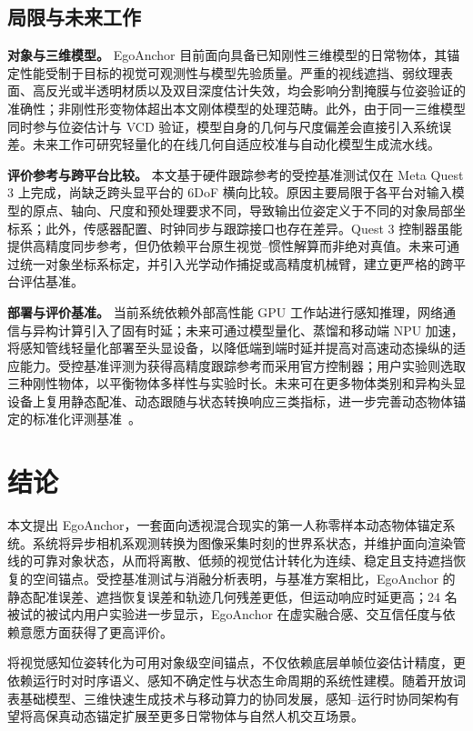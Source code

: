 \documentclass[review]{vgtc}
\begin{document}
\subsection{局限与未来工作}

\textbf{对象与三维模型。}
EgoAnchor 目前面向具备已知刚性三维模型的日常物体，其锚定性能受制于目标的视觉可观测性与模型先验质量。严重的视线遮挡、弱纹理表面、高反光或半透明材质以及双目深度估计失效，均会影响分割掩膜与位姿验证的准确性；非刚性形变物体超出本文刚体模型的处理范畴。此外，由于同一三维模型同时参与位姿估计与 VCD 验证，模型自身的几何与尺度偏差会直接引入系统误差。未来工作可研究轻量化的在线几何自适应校准与自动化模型生成流水线。

\textbf{评价参考与跨平台比较。}
本文基于硬件跟踪参考的受控基准测试仅在 Meta Quest 3 上完成，尚缺乏跨头显平台的 6DoF 横向比较。原因主要局限于各平台对输入模型的原点、轴向、尺度和预处理要求不同，导致输出位姿定义于不同的对象局部坐标系；此外，传感器配置、时钟同步与跟踪接口也存在差异。Quest 3 控制器虽能提供高精度同步参考，但仍依赖平台原生视觉--惯性解算而非绝对真值。未来可通过统一对象坐标系标定，并引入光学动作捕捉或高精度机械臂，建立更严格的跨平台评估基准。

\textbf{部署与评价基准。}
当前系统依赖外部高性能 GPU 工作站进行感知推理，网络通信与异构计算引入了固有时延；未来可通过模型量化、蒸馏和移动端 NPU 加速，将感知管线轻量化部署至头显设备，以降低端到端时延并提高对高速动态操纵的适应能力。受控基准评测为获得高精度跟踪参考而采用官方控制器；用户实验则选取三种刚性物体，以平衡物体多样性与实验时长。未来可在更多物体类别和异构头显设备上复用静态配准、动态跟随与状态转换响应三类指标，进一步完善动态物体锚定的标准化评测基准~\cite{cheng2024tracking,hu2024applemeta,hu2025xrrealitycheck}。

\section{结论}\label{sec:conclusion}

本文提出 EgoAnchor，一套面向透视混合现实的第一人称零样本动态物体锚定系统。系统将异步相机系观测转换为图像采集时刻的世界系状态，并维护面向渲染管线的可靠对象状态，从而将离散、低频的视觉估计转化为连续、稳定且支持遮挡恢复的空间锚点。受控基准测试与消融分析表明，与基准方案相比，EgoAnchor 的静态配准误差、遮挡恢复误差和轨迹几何残差更低，但运动响应时延更高；24 名被试的被试内用户实验进一步显示，EgoAnchor 在虚实融合感、交互信任度与依赖意愿方面获得了更高评价。

将视觉感知位姿转化为可用对象级空间锚点，不仅依赖底层单帧位姿估计精度，更依赖运行时对时序语义、感知不确定性与状态生命周期的系统性建模。随着开放词表基础模型、三维快速生成技术与移动算力的协同发展，感知--运行时协同架构有望将高保真动态锚定扩展至更多日常物体与自然人机交互场景。




\end{document}
